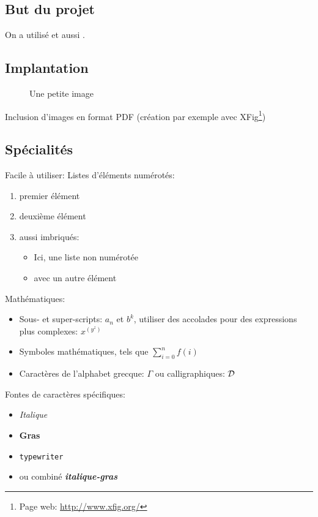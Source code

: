 \documentclass{article}
\begin{document}
{\subsection{But du projet}
On a utilisé
\cite{lindholm99_java_virtual_machin_specif,moore89_system_verif} et
aussi \cite{strecker02_verif_java_compil}.

\subsection{Implantation}

\begin{figure}[htbp]
  \centering
  \caption{Une petite image}
  \label{fig:im}
\end{figure}

Inclusion d'images en format PDF (création par exemple avec
XFig\footnote{Page web: \url{http://www.xfig.org/}})

\subsection{Spécialités}

Facile à utiliser: Listes d'éléments numérotés:
\begin{enumerate}
\item premier élément
\item deuxième élément
\item aussi imbriqués:
%
\begin{itemize}
\item Ici, une liste non numérotée
\item avec un autre élément
\end{itemize}
%
\end{enumerate}

Mathématiques:
\begin{itemize}
\item Sous- et super-scripts: $a_n$ et $b^k$, utiliser des accolades
  pour des expressions plus complexes: $x^{(y^z)}$

\item Symboles mathématiques, tels que $\sum_{i=0}^{n} f(i)$

\item Caractères de l'alphabet grecque: $\Gamma$ ou calligraphiques: ${\cal D}$
\end{itemize}

Fontes de caractères spécifiques:
\begin{itemize}
\item \emph{Italique}
\item \textbf{Gras}
\item \texttt{typewriter}
\item ou combiné \emph{\textbf{italique-gras}}
\end{itemize}

}
\end{document}
